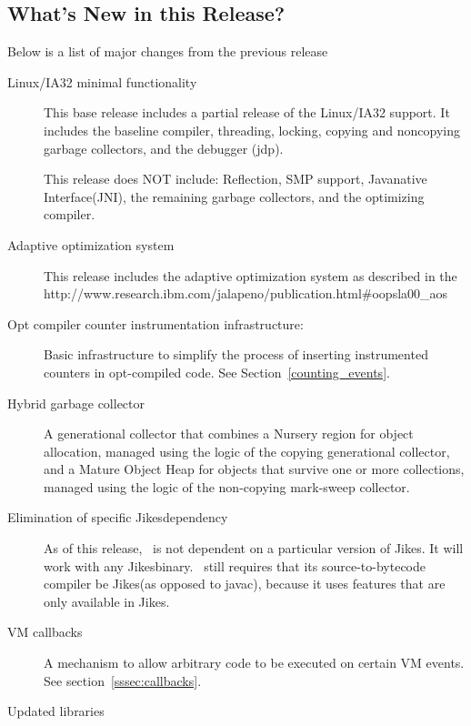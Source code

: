 \subsection{What's New in this Release?}

Below is a list of major changes from the previous release
\begin{description}
\item [Linux/IA32 minimal functionality]
This base release includes a partial release of the Linux/IA32 support.
It includes the baseline compiler, threading, locking, copying
and noncopying garbage collectors, and the debugger (jdp).

This release does NOT include: Reflection, SMP support, Java\trademark native
Interface(JNI), 
the remaining garbage collectors,
and the optimizing compiler. 

\item [Adaptive optimization system]
This release includes the adaptive optimization system as described
in the 
{http://www.research.ibm.com/jalapeno/publication.html\#oopsla00\_aos}
\T~\cite{jalapeno-adaptive-00}

\item [Opt compiler counter instrumentation infrastructure:]
Basic infrastructure to simplify the process of inserting
instrumented counters in opt-compiled code. See
Section~\ref{counting_events}.

\item [Hybrid garbage collector]
A generational collector that combines a Nursery region for object
allocation, managed using the logic of the copying generational collector,
and a Mature Object Heap for objects that survive one or more
collections, managed using the logic of the non-copying
mark-sweep collector.

\item [Elimination of specific Jikes\trademark dependency]
As of this release, \jp\ is not dependent on a particular version of
Jikes\trademark.  It will work with any Jikes\trademark binary.  \jp\ still requires that
its source-to-bytecode compiler be Jikes\trademark (as opposed to javac), because
it uses features that are only available in Jikes\trademark.

\item [VM callbacks]
A mechanism to allow arbitrary code to be executed on certain VM events.
See section~\ref{sssec:callbacks}.

\item [Updated libraries]

\end{description}

